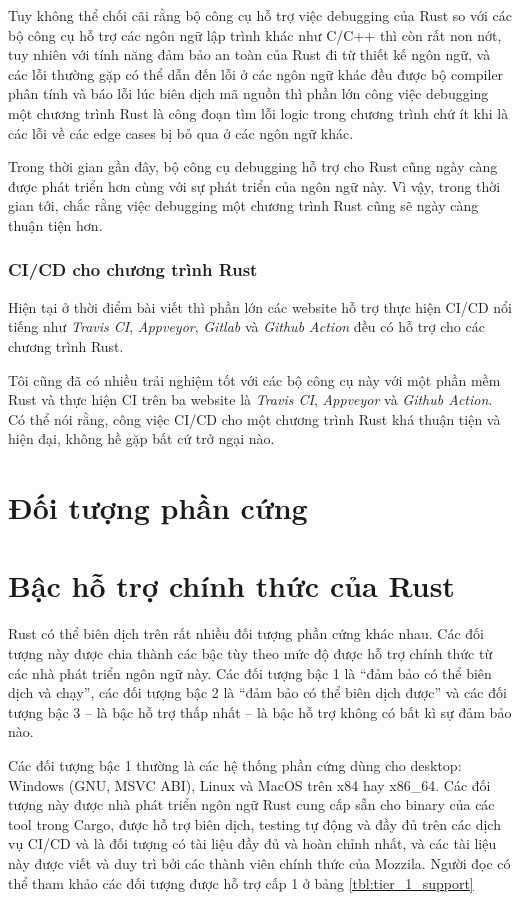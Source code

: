 Tuy không thể chối cãi rằng bộ công cụ hỗ trợ việc debugging của Rust so với các bộ công cụ hỗ trợ các ngôn ngữ lập trình khác như C/C++ thì còn rất non nớt, tuy nhiên với tính năng đảm bảo an toàn của Rust đi từ thiết kế ngôn ngữ, và các lỗi thường gặp có thể dẫn đến lỗi ở các ngôn ngữ khác đều được bộ compiler phân tính và báo lỗi lúc biên dịch mã nguồn thì phần lớn công việc debugging một chương trình Rust là công đoạn tìm lỗi logic trong chương trình chứ ít khi là các lỗi về các edge cases bị bỏ qua ở các ngôn ngữ khác.

Trong thời gian gần đây, bộ công cụ debugging hỗ trợ cho Rust cũng ngày càng được phát triển hơn cùng với sự phát triển của ngôn ngữ này.
Vì vậy, trong thời gian tới, chắc rằng việc debugging một chương trình Rust cũng sẽ ngày càng thuận tiện hơn.
\subsubsection{CI/CD cho chương trình Rust}
Hiện tại ở thời điểm bài viết thì phần lớn các website hỗ trợ thực hiện CI/CD nổi tiếng như \emph{Travis CI}, \emph{Appveyor}, \emph{Gitlab} và \emph{Github Action} đều có hỗ trợ cho các chương trình Rust.

Tôi cũng đã có nhiều trải nghiệm tốt với các bộ công cụ này với một phần mềm Rust và thực hiện CI trên ba website là \emph{Travis CI}, \emph{Appveyor} và \emph{Github Action}.
Có thể nói rằng, công việc CI/CD cho một chương trình Rust khá thuận tiện và hiện đại, không hề gặp bất cứ trở ngại nào.

\section{Đối tượng phần cứng}
\section{Bậc hỗ trợ chính thức của Rust}
Rust có thể biên dịch trên rất nhiều đối tượng phần cứng khác nhau.
Các đối tượng này được chia thành các bậc tùy theo mức độ được hỗ trợ chính thức từ các nhà phát triển ngôn ngữ này.
Các đối tượng bậc 1 là ``đảm bảo có thể biên dịch và chạy'', các đối tượng bậc 2 là ``đảm bảo có thể biên dịch được'' và các đối tượng bậc 3 -- là bậc hỗ trợ thấp nhất -- là bậc hỗ trợ không có bất kì sự đảm bảo nào.

Các đối tượng bậc 1 thường là các hệ thống phần cứng dùng cho desktop: Windows (GNU, MSVC ABI), Linux và MacOS trên x84 hay x86\_64.
Các đối tượng này được nhà phát triển ngôn ngữ Rust cung cấp sẵn cho binary của các tool trong Cargo, được hỗ trợ biên dịch, testing tự động và đầy đủ trên các dịch vụ CI/CD và là đối tượng có tài liệu đầy đủ và hoàn chỉnh nhất, và các tài liệu này được viết và duy trì bởi các thành viên chính thức của Mozzila.
Người đọc có thể tham khảo các đối tượng được hỗ trợ cấp 1 ở bảng \ref{tbl:tier_1_support}

